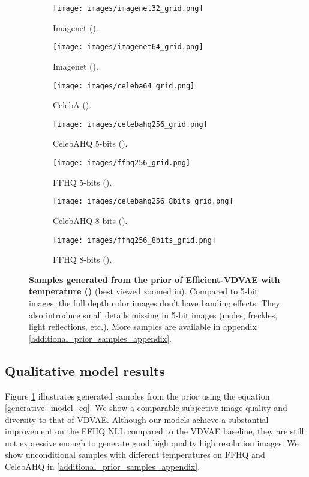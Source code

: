 \documentclass{article}
\begin{document}
\begin{figure}
    \centering
    \begin{subfigure}[t]{0.32\textwidth}
        \centering
        \texttt{[image: images/imagenet32\_grid.png]} 
        \caption{Imagenet  ().}
    \end{subfigure}
    \hfill
    \begin{subfigure}[t]{0.32\textwidth}
        \centering
        \texttt{[image: images/imagenet64\_grid.png]} 
        \caption{Imagenet  ().}
    \end{subfigure}
    \hfill
    \begin{subfigure}[t]{0.32\textwidth}
        \centering
        \texttt{[image: images/celeba64\_grid.png]} 
        \caption{CelebA  ().}
    \end{subfigure}
    \vfill
    \begin{subfigure}[t]{.425\textwidth}
    \centering
        \texttt{[image: images/celebahq256\_grid.png]} 
        \caption{CelebAHQ  5-bits ().}
    \end{subfigure}
    \hskip 0.1in
    \begin{subfigure}[t]{.425\textwidth}
    \centering
        \texttt{[image: images/ffhq256\_grid.png]} 
        \caption{FFHQ  5-bits ().}
    \end{subfigure}
    \vfill
    \begin{subfigure}[t]{.425\textwidth}
    \centering
        \texttt{[image: images/celebahq256\_8bits\_grid.png]} 
        \caption{CelebAHQ  8-bits ().}
    \end{subfigure}
    \hskip 0.1in
    \begin{subfigure}[t]{.425\textwidth}
    \centering
        \texttt{[image: images/ffhq256\_8bits\_grid.png]} 
        \caption{FFHQ  8-bits ().}
    \end{subfigure}
    \caption{\textbf{Samples generated from the prior of Efficient-VDVAE with temperature ()} (best viewed zoomed in). Compared to 5-bit images, the full depth color images don't have banding effects. They also introduce small details missing in 5-bit images (moles, freckles, light reflections, etc.). More samples are available in appendix \ref{additional_prior_samples_appendix}.}
    \label{prior_samples}
\end{figure}

\subsection{Qualitative model results}
Figure \ref{prior_samples} illustrates generated samples from the prior using the equation \ref{generative_model_eq}. We show a comparable subjective image quality and diversity to that of VDVAE. Although our models achieve a substantial improvement on the FFHQ  NLL compared to the VDVAE baseline, they are still not expressive enough to generate good high quality high resolution images. We show unconditional samples with different temperatures on FFHQ  and CelebAHQ  in \ref{additional_prior_samples_appendix}.
\end{document}
